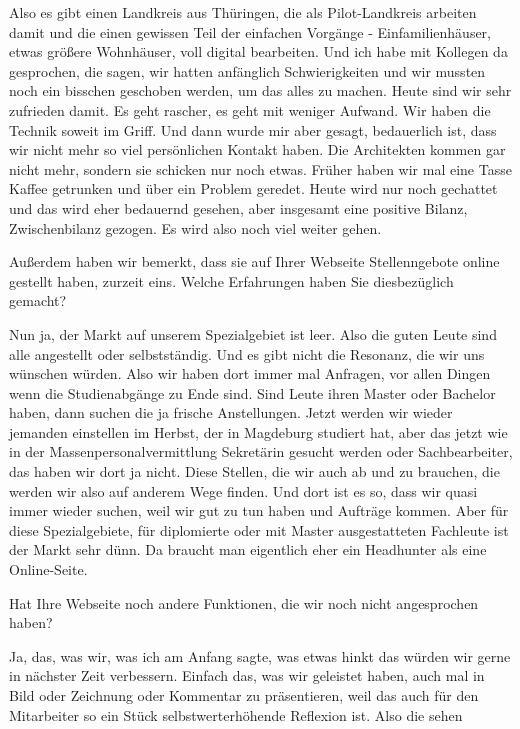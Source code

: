 \begin{description}
\Andre Also es gibt einen Landkreis aus Thüringen, die als Pilot-Landkreis arbeiten damit und die einen gewissen Teil der einfachen Vorgänge - Einfamilienhäuser, etwas größere Wohnhäuser, voll digital bearbeiten. Und ich habe mit Kollegen da gesprochen, die sagen, wir hatten anfänglich Schwierigkeiten und wir mussten noch ein bisschen geschoben werden, um das alles zu machen. Heute sind wir sehr zufrieden damit. Es geht rascher, es geht mit weniger Aufwand. Wir haben die Technik soweit im Griff. Und dann wurde mir aber gesagt, bedauerlich ist, dass wir nicht mehr so viel persönlichen Kontakt haben. Die Architekten kommen gar nicht mehr, sondern sie schicken nur noch etwas. Früher haben wir mal eine Tasse Kaffee getrunken und über ein Problem geredet. Heute wird nur noch gechattet und das wird eher bedauernd gesehen, aber insgesamt eine positive Bilanz, Zwischenbilanz gezogen. Es wird also noch viel weiter gehen.

\Fabian Außerdem haben wir bemerkt, dass sie auf Ihrer Webseite Stellenngebote online gestellt haben, zurzeit eins. Welche Erfahrungen haben Sie diesbezüglich gemacht?

\Andre Nun ja, der Markt auf unserem Spezialgebiet ist leer. Also die guten Leute sind alle angestellt oder selbstständig. Und es gibt nicht die Resonanz, die wir uns wünschen würden. Also wir haben dort immer mal Anfragen, vor allen Dingen wenn die Studienabgänge zu Ende sind. Sind Leute ihren Master oder Bachelor haben, dann suchen die ja frische Anstellungen. Jetzt werden wir wieder jemanden einstellen im Herbst, der in Magdeburg studiert hat, aber das jetzt wie in der Massenpersonalvermittlung Sekretärin gesucht werden oder Sachbearbeiter, das haben wir dort ja nicht. Diese Stellen, die wir auch ab und zu brauchen, die werden wir also auf anderem Wege finden. Und dort ist es so, dass wir quasi immer wieder suchen, weil wir gut zu tun haben und Aufträge kommen. Aber für diese Spezialgebiete, für diplomierte oder mit Master ausgestatteten Fachleute ist der Markt sehr dünn. Da braucht man eigentlich eher ein Headhunter als eine Online-Seite.

\Fabian Hat Ihre Webseite noch andere Funktionen, die wir noch nicht angesprochen haben?

\Andre Ja, das, was wir, was ich am Anfang sagte, was etwas hinkt das würden wir gerne in nächster Zeit verbessern. Einfach das, was wir geleistet haben, auch mal in Bild oder Zeichnung oder Kommentar zu präsentieren, weil das auch für den Mitarbeiter so ein Stück selbstwerterhöhende Reflexion ist. Also die sehen

\end{description}
